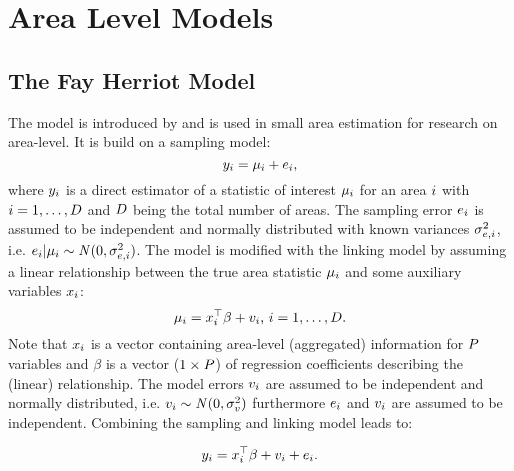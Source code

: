 \section{Area Level Models}\label{area-level-models}

\subsection{The Fay Herriot Model}\label{the-fay-herriot-model}

The model is introduced by \textcite{Fay79} and is used in small area
estimation for research on area-level. It is build on a sampling model:
\[
y_{i} = \mu_{i} + e_{i},
\] where $y_{i}$ is a direct estimator of a
statistic of interest $\mu_{i}$ for an area
$i$ with $i = 1, \dots, D$ and $D$
being the total number of areas. The sampling error
$e_{i}$ is assumed to be independent and
normally distributed with known variances $\sigma_{e, i}^2$,
i.e.
$e_{i}|\mu_{i} \sim \mathit{N}(0, \sigma_{e, i}^2)$.
The model is modified with the linking model by assuming a linear
relationship between the true area statistic $\mu_{i}$
and some auxiliary variables $x_{i}$: \[
\mu_{i} = x_{i}^\top \beta + v_{i}\text{, } i=1,\dots, D.
\] Note that $x_{i}$ is a vector containing area-level (aggregated)
information for $P$ variables and $\beta$ is a vector
($1\times P$) of regression coefficients describing the
(linear) relationship. The model errors $v_{i}$ are
assumed to be independent and normally distributed, i.e.
$v_{i} \sim \mathit{N}(0, \sigma_v^2)$
furthermore $e_{i}$ and $v_{i}$ are
assumed to be independent. Combining the sampling and linking model
leads to:

\begin{align}
\label{eq:FH}
y_{i} = x_{i}^\top \beta + v_{i} + e_{i}.
\end{align}
